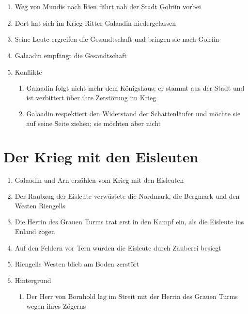 \documentclass[12pt,a4paper,onecolumn,oneside,ngerman]{book}
\newcommand{\Tern}{Tern}
\newcommand{\Enland}{Enland}
\newcommand{\Schattenlaufer}{Schattenläufer}
\newcommand{\Nordmark}{Nordmark}
\newcommand{\Bergmark}{Bergmark}
\newcommand{\Bornhold}{Bornhold}
\newcommand{\Arn}{Arn}
\newcommand{\Eisleute}{Eisleute}
\newcommand{\Rhingell}{Riengell}
\newcommand{\Mundis}{Mundis}
\newcommand{\Golrin}{Golriin}
\newcommand{\Galadin}{Galaadin}
\newcommand{\Rhin}{Rien}
\begin{document}
\chapter[Der Weg am Fluss]{}
\begin{enumerate}
  \item Weg von {\Mundis} nach {\Rhin} führt nah der Stadt {\Golrin} vorbei
  \item Dort hat sich im Krieg Ritter {\Galadin} niedergelassen
  \item Seine Leute ergreifen die Gesandtschaft und bringen sie nach {\Golrin}
  \item {\Galadin} empfängt die Gesandtschaft
  \item Konflikte
  \begin{enumerate}
    \item {\Galadin} folgt nicht mehr dem Königshaus; er stammt aus der Stadt und ist verbittert über ihre Zerstörung im Krieg
    \item {\Galadin} respektiert den Widerstand der {\Schattenlaufer} und möchte sie auf seine Seite ziehen; sie möchten aber nicht
  \end{enumerate}
\end{enumerate}

\chapter[Galadin und Arn erzählen vom Krieg mit den Eisleuten]{Der Krieg mit den Eisleuten}
\begin{enumerate}
  \item {\Galadin} und {\Arn} erzählen vom Krieg mit den Eisleuten
  \item Der  Raubzug der {\Eisleute} verwüstete die {\Nordmark}, die {\Bergmark} und den Westen {\Rhingell}s
  \item Die Herrin des Grauen Turms trat erst in den Kampf ein, als die {\Eisleute} ins {\Enland} zogen
  \item Auf den Feldern vor {\Tern} wurden die {\Eisleute} durch Zauberei besiegt
  \item {\Rhingell}s Westen blieb am Boden zerstört
  \item Hintergrund
  \begin{enumerate}
    \item Der Herr von {\Bornhold} lag im Streit mit der Herrin des Grauen Turms wegen ihres Zögerns 
  \end{enumerate}
\end{enumerate}
 
\end{document}
